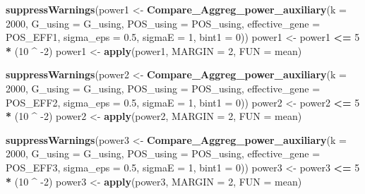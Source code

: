 \documentclass[
]{article}
\newenvironment{Shaded}{\begin{snugshade}}{\end{snugshade}}
\newcommand{\DataTypeTok}[1]{\textcolor[rgb]{0.13,0.29,0.53}{#1}}
\newcommand{\DecValTok}[1]{\textcolor[rgb]{0.00,0.00,0.81}{#1}}
\newcommand{\FloatTok}[1]{\textcolor[rgb]{0.00,0.00,0.81}{#1}}
\newcommand{\KeywordTok}[1]{\textcolor[rgb]{0.13,0.29,0.53}{\textbf{#1}}}
\newcommand{\NormalTok}[1]{#1}
\newcommand{\OperatorTok}[1]{\textcolor[rgb]{0.81,0.36,0.00}{\textbf{#1}}}
\newcommand{\StringTok}[1]{\textcolor[rgb]{0.31,0.60,0.02}{#1}}
\begin{document}
\begin{Shaded}
\begin{Highlighting}[]
\KeywordTok{suppressWarnings}\NormalTok{(power1 <-}\StringTok{ }\KeywordTok{Compare_Aggreg_power_auxiliary}\NormalTok{(}\DataTypeTok{k =} \DecValTok{2000}\NormalTok{, }\DataTypeTok{G_using =}\NormalTok{ G_using, }\DataTypeTok{POS_using =}\NormalTok{ POS_using, }\DataTypeTok{effective_gene =}\NormalTok{ POS_EFF1, }\DataTypeTok{sigma_eps =} \FloatTok{0.5}\NormalTok{, }\DataTypeTok{sigmaE =} \DecValTok{1}\NormalTok{, }\DataTypeTok{bint1 =} \DecValTok{0}\NormalTok{))}
\NormalTok{power1 <-}\StringTok{ }\NormalTok{power1 }\OperatorTok{<=}\StringTok{ }\DecValTok{5} \OperatorTok{*}\StringTok{ }\NormalTok{(}\DecValTok{10} \OperatorTok{^}\StringTok{ }\DecValTok{-2}\NormalTok{)}
\NormalTok{power1 <-}\StringTok{ }\KeywordTok{apply}\NormalTok{(power1, }\DataTypeTok{MARGIN =} \DecValTok{2}\NormalTok{, }\DataTypeTok{FUN =}\NormalTok{ mean)}

\KeywordTok{suppressWarnings}\NormalTok{(power2 <-}\StringTok{ }\KeywordTok{Compare_Aggreg_power_auxiliary}\NormalTok{(}\DataTypeTok{k =} \DecValTok{2000}\NormalTok{, }\DataTypeTok{G_using =}\NormalTok{ G_using, }\DataTypeTok{POS_using =}\NormalTok{ POS_using, }\DataTypeTok{effective_gene =}\NormalTok{ POS_EFF2, }\DataTypeTok{sigma_eps =} \FloatTok{0.5}\NormalTok{, }\DataTypeTok{sigmaE =} \DecValTok{1}\NormalTok{, }\DataTypeTok{bint1 =} \DecValTok{0}\NormalTok{))}
\NormalTok{power2 <-}\StringTok{ }\NormalTok{power2 }\OperatorTok{<=}\StringTok{ }\DecValTok{5} \OperatorTok{*}\StringTok{ }\NormalTok{(}\DecValTok{10} \OperatorTok{^}\StringTok{ }\DecValTok{-2}\NormalTok{)}
\NormalTok{power2 <-}\StringTok{ }\KeywordTok{apply}\NormalTok{(power2, }\DataTypeTok{MARGIN =} \DecValTok{2}\NormalTok{, }\DataTypeTok{FUN =}\NormalTok{ mean)}

\KeywordTok{suppressWarnings}\NormalTok{(power3 <-}\StringTok{ }\KeywordTok{Compare_Aggreg_power_auxiliary}\NormalTok{(}\DataTypeTok{k =} \DecValTok{2000}\NormalTok{, }\DataTypeTok{G_using =}\NormalTok{ G_using, }\DataTypeTok{POS_using =}\NormalTok{ POS_using, }\DataTypeTok{effective_gene =}\NormalTok{ POS_EFF3, }\DataTypeTok{sigma_eps =} \FloatTok{0.5}\NormalTok{, }\DataTypeTok{sigmaE =} \DecValTok{1}\NormalTok{, }\DataTypeTok{bint1 =} \DecValTok{0}\NormalTok{))}
\NormalTok{power3 <-}\StringTok{ }\NormalTok{power3 }\OperatorTok{<=}\StringTok{ }\DecValTok{5} \OperatorTok{*}\StringTok{ }\NormalTok{(}\DecValTok{10} \OperatorTok{^}\StringTok{ }\DecValTok{-2}\NormalTok{)}
\NormalTok{power3 <-}\StringTok{ }\KeywordTok{apply}\NormalTok{(power3, }\DataTypeTok{MARGIN =} \DecValTok{2}\NormalTok{, }\DataTypeTok{FUN =}\NormalTok{ mean)}


\end{Highlighting}
\end{Shaded}
\end{document}
